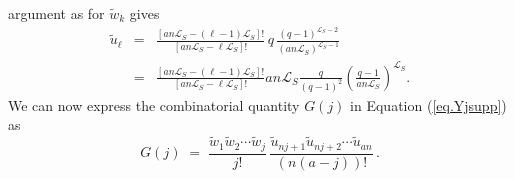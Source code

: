 \documentclass[journal=mamobx,manuscript=article]{achemso}
\newcommand{\leng}{\mathcal{L}}
\begin{document}
argument as for $\tilde{w}_k$ gives
\begin{eqnarray}
   \tilde{u}_{\ell}  
 & = &    \frac{[an\leng_S-(\ell-1)\leng_S]!}{[an\leng_S-\ell \leng_S]!} \,q\,  \frac{(q-1)^{\leng_S-2}}{(an\leng_S)^{\leng_S-1}}  
     \nonumber    \\
     & = &    \frac{[an\leng_S-(\ell-1)\leng_S]!}{[an\leng_S-\ell \leng_S]!}   an\leng_S \frac{q}{(q-1)^2}\left(  \frac{q-1}{an\leng_S}\right)^{\leng_S}.
     \label{eq.uell2supp}
\end{eqnarray}
We can now express the combinatorial quantity $G(j)$ 
in Equation (\ref{eq.Yjsupp}) as
\begin{equation}
    \label{eq.Gformulasupp}
      G(j) \;=\;      \frac{\tilde{w}_1\tilde{w}_2\cdots \tilde{w}_j}{j!}
                    \,   \frac{\tilde{u}_{nj+1}\tilde{u}_{nj+2}\cdots \tilde{u}_{an}}{(n(a-j))!}  \,.
\end{equation}



\end{document}
